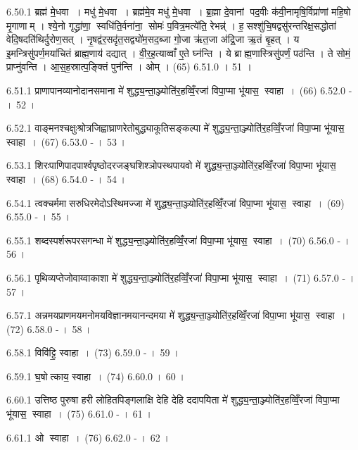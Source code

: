 6.50.1
ब्रह्म॑ मे॒धवा । मधु॑ मे॒धवा । ब्रह्म॑मे॒व मधु॑ मे॒धवा । ब्र॒ह्मा दे॒वानां पद॒वीः क॑वी॒नामृषि॒र्विप्रा॑णां महि॒षो मृ॒गाणाम् । श्ये॒नो गृद्ध्रा॑णा॒ स्वधि॑ति॒र्वना॑ना॒ सोमः॑ प॒वित्र॒मत्ये॑ति॒ रेभन्न्॑ । ह॒सश्शु॑चि॒षद्वसु॑रन्तरिक्ष॒सद्धोता॑ वेदि॒षदति॑थिर्दुरोण॒सत् । नृ॒षद्व॑र॒सदृ॑त॒सद्व्यो॑म॒सद॒ब्जा गो॒जा ऋ॑त॒जा अ॑द्रि॒जा ऋ॒तं बृ॒हत् । य इ॒मन्त्रिसु॑पर्ण॒मया॑चितं ब्राह्म॒णाय॑ दद्यात् । वी॒र॒ह॒त्याव्वाँ ए॒ते घ्न॑न्ति । ये ब्राह्म॒णास्त्रिसु॑पर्णं॒ पठ॑न्ति । ते सोमं॒ प्राप्नु॑वन्ति । आ॒स॒ह॒स्रात्प॒ङ्क्तिं पुन॑न्ति । ओम् । (65)
6.51.0
। 51 ।
\anuvakamend

6.51.1
प्राणापानव्यानोदानसमाना मे॑ शुद्ध्य॒न्ता॒ञ्ज्योति॑र॒हव्विँ॒रजा॑ विपा॒प्मा भू॑यास॒ स्वाहा । (66)
6.52.0
- । 52 ।
\anuvakamend

6.52.1
वाङ्मनश्चक्षुःश्रोत्रजिह्वाघ्राणरेतोबुद्ध्याकूतिसङ्कल्पा मे॑ शुद्ध्य॒न्ता॒ञ्ज्योति॑र॒हव्विँ॒रजा॑ विपा॒प्मा भू॑यास॒ स्वाहा । (67)
6.53.0
- । 53 ।
\anuvakamend

6.53.1
शिरःपाणिपादपार्श्वपृष्ठोदरजङ्घशिश्ञोपस्थपायवो मे॑ शुद्ध्य॒न्ता॒ञ्ज्योति॑र॒हव्विँ॒रजा॑ विपा॒प्मा भू॑यास॒ स्वाहा । (68)
6.54.0
- । 54 ।
\anuvakamend

6.54.1
त्वक्चर्ममासरुधिरमेदोऽस्थिमज्जा मे॑ शुद्ध्य॒न्ता॒ञ्ज्योति॑र॒हव्विँ॒रजा॑ विपा॒प्मा भू॑यास॒ स्वाहा । (69)
6.55.0
- । 55 ।
\anuvakamend

6.55.1
शब्दस्पर्शरूपरसगन्धा मे॑ शुद्ध्य॒न्ता॒ञ्ज्योति॑र॒हव्विँ॒रजा॑ विपा॒प्मा भू॑यास॒ स्वाहा । (70)
6.56.0
- । 56 ।
\anuvakamend

6.56.1
पृथिव्यप्तेजोवाय्वाकाशा मे॑ शुद्ध्य॒न्ता॒ञ्ज्योति॑र॒हव्विँ॒रजा॑ विपा॒प्मा भू॑यास॒ स्वाहा । (71)
6.57.0
- । 57 ।
\anuvakamend

6.57.1
अन्नमयप्राणमयमनोमयविज्ञानमयानन्दमया मे॑ शुद्ध्य॒न्ता॒ञ्ज्योति॑र॒हव्विँ॒रजा॑ विपा॒प्मा भू॑यास॒ स्वाहा । (72)
6.58.0
- । 58 ।
\anuvakamend

6.58.1
विवि॑ट्टि॒ स्वाहा । (73)
6.59.0
- । 59 ।
\anuvakamend

6.59.1
घ॒षोत्काय॒ स्वाहा । (74)
6.60.0
। 60 ।
\anuvakamend

6.60.1
उत्तिष्ठ पुरुषा हरी लोहितपिङ्गलाक्षि देहि देहि ददापयिता मे॑ शुद्ध्य॒न्ता॒ञ्ज्योति॑र॒हव्विँ॒रजा॑ विपा॒प्मा भू॑यास॒ स्वाहा । (75)
6.61.0
- । 61 ।
\anuvakamend

6.61.1
ओ स्वाहा । (76)
6.62.0
- । 62 ।
\anuvakamend

